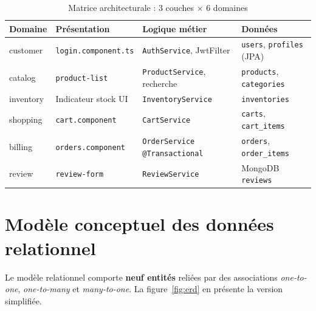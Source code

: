 \documentclass[11pt,a4paper,oneside]{report}
\begin{document}
\begin{table}[htbp]
\centering
\caption{Matrice architecturale : 3 couches × 6 domaines}
\label{tab:matrix}
\small
\begin{tabularx}{\textwidth}{lXXX}
\toprule
\textbf{Domaine} & \textbf{Présentation} & \textbf{Logique métier} & \textbf{Données}\\
\midrule
customer  & \texttt{login.component.ts}  & \texttt{AuthService}, JwtFilter   & \texttt{users}, \texttt{profiles} (JPA)\\
catalog   & \texttt{product-list}        & \texttt{ProductService}, recherche & \texttt{products}, \texttt{categories}\\
inventory & Indicateur stock UI         & \texttt{InventoryService}         & \texttt{inventories}\\
shopping  & \texttt{cart.component}      & \texttt{CartService}              & \texttt{carts}, \texttt{cart\_items}\\
billing   & \texttt{orders.component}    & \texttt{OrderService} \texttt{@Transactional} & \texttt{orders}, \texttt{order\_items}\\
review    & \texttt{review-form}         & \texttt{ReviewService}            & MongoDB \texttt{reviews}\\
\bottomrule
\end{tabularx}
\end{table}

\section{Modèle conceptuel des données relationnel}

Le modèle relationnel comporte \textbf{neuf entités} reliées par des
associations \textit{one-to-one}, \textit{one-to-many} et
\textit{many-to-one}. La figure~\ref{fig:erd} en présente la version
simplifiée.
\end{document}
